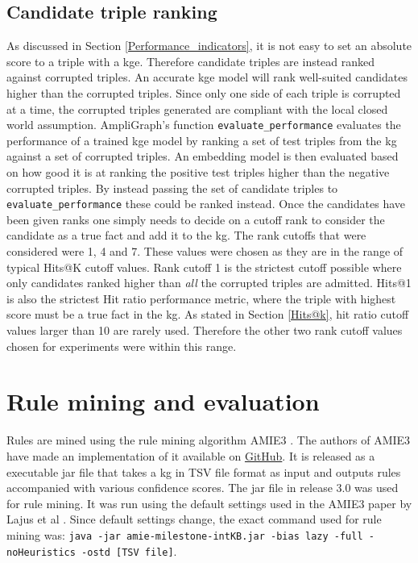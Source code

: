 

\subsection{Candidate triple ranking}
As discussed in Section \ref{Performance_indicators}, it is not easy to set an absolute score to a triple with a \gls{kge}. Therefore candidate triples are instead ranked against corrupted triples. An accurate \gls{kge} model will rank well-suited candidates higher than the corrupted triples. Since only one side of each triple is corrupted at a time, the corrupted triples generated are compliant with the local closed world assumption. AmpliGraph's function \texttt{evaluate\_performance} evaluates the performance of a trained \gls{kge} model by ranking a set of test triples from the \gls{kg} against a set of corrupted triples. An embedding model is then evaluated based on how good it is at ranking the positive test triples higher than the negative corrupted triples. By instead passing the set of candidate triples to \texttt{evaluate\_performance} these could be ranked instead. Once the candidates have been given ranks one simply needs to decide on a cutoff rank to consider the candidate as a true fact and add it to the \gls{kg}. The rank cutoffs that were considered were 1, 4 and 7. These values were chosen as they are in the range of typical Hits@K cutoff values. Rank cutoff 1 is the strictest cutoff possible where only candidates ranked higher than \textit{all} the corrupted triples are admitted. Hits@1 is also the strictest Hit ratio performance metric, where the triple with highest score must be a true fact in the \gls{kg}. As stated in Section \ref{Hits@k}, hit ratio cutoff values larger than 10 are rarely used. Therefore the other two rank cutoff values chosen for experiments were within this range.

\section{Rule mining and evaluation}
Rules are mined using the rule mining algorithm AMIE3 \cite{amie3}. The authors of AMIE3 have made an implementation of it available on \hyperlink{https://github.com/lajus/amie}{GitHub}. It is released as a executable jar file that takes a \gls{kg} in TSV file format as input and outputs rules accompanied with various confidence scores. The jar file in release 3.0 was used for rule mining. It was run using the default settings used in the AMIE3 paper by Lajus et al \cite{amie3}. Since default settings change, the exact command used for rule mining was: \texttt{java -jar amie-milestone-intKB.jar -bias lazy -full -noHeuristics -ostd [TSV file]}.

